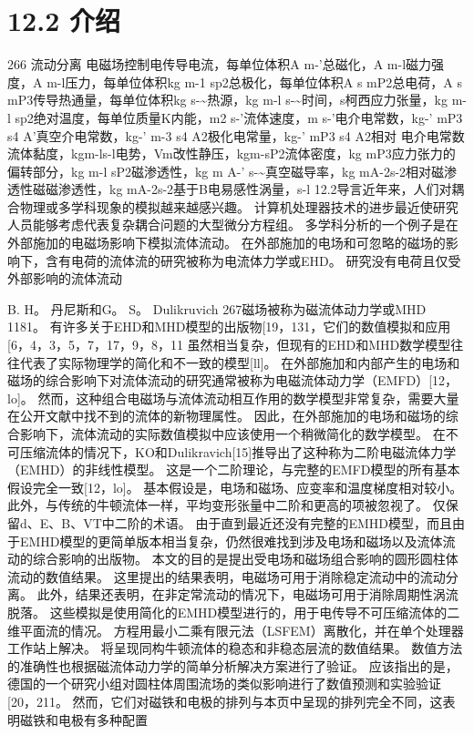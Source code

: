 \documentclass[UTF8,11pt,a4paper,openany,fontset=fandol]{ctexbook}
\begin{document}
\section{12.2 介绍}
266 流动分离 电磁场控制电传导电流，每单位体积A m-'总磁化，A m-l磁力强度，A m-l压力，每单位体积kg m-1 sp2总极化，每单位体积A s mP2总电荷，A s mP3传导热通量，每单位体积kg s-\textasciitilde{}热源，kg m-l s-\textasciitilde{}时间，s柯西应力张量，kg m-l sp2绝对温度，每单位质量K内能，m2 s-'流体速度，m s-'电介电常数，kg-' mP3 s4 A'真空介电常数，kg-' m-3 s4 A2极化电常量，kg-' mP3 s4 A2相对 电介电常数流体黏度，kgm-ls-l电势，Vm改性静压，kgm-sP2流体密度，kg mP3应力张力的偏转部分，kg m-l sP2磁渗透性，kg m A-' s-\textasciitilde{}真空磁导率，kg mA-2s-2相对磁渗透性磁磁渗透性，kg mA-2s-2基于B电易感性涡量，s-l 12.2导言近年来，人们对耦合物理或多学科现象的模拟越来越感兴趣。 计算机处理器技术的进步最近使研究人员能够考虑代表复杂耦合问题的大型微分方程组。 多学科分析的一个例子是在外部施加的电磁场影响下模拟流体流动。 在外部施加的电场和可忽略的磁场的影响下，含有电荷的流体流的研究被称为电流体力学或EHD。 研究没有电荷且仅受外部影响的流体流动

B. H。 丹尼斯和G。 S。 Dulikruvich 267磁场被称为磁流体动力学或MHD 1181。 有许多关于EHD和MHD模型的出版物[19，131，它们的数值模拟和应用[6，4，3，5，7，17，9，8，11 虽然相当复杂，但现有的EHD和MHD数学模型往往代表了实际物理学的简化和不一致的模型[ll]。 在外部施加和内部产生的电场和磁场的综合影响下对流体流动的研究通常被称为电磁流体动力学（EMFD）[12，lo]。 然而，这种组合电磁场与流体流动相互作用的数学模型非常复杂，需要大量在公开文献中找不到的流体的新物理属性。 因此，在外部施加的电场和磁场的综合影响下，流体流动的实际数值模拟中应该使用一个稍微简化的数学模型。 在不可压缩流体的情况下，KO和Dulikravich[15]推导出了这种称为二阶电磁流体力学（EMHD）的非线性模型。 这是一个二阶理论，与完整的EMFD模型的所有基本假设完全一致[12，lo]。 基本假设是，电场和磁场、应变率和温度梯度相对较小。 此外，与传统的牛顿流体一样，平均变形张量中二阶和更高的项被忽视了。 仅保留d、E、B、VT中二阶的术语。 由于直到最近还没有完整的EMHD模型，而且由于EMHD模型的更简单版本相当复杂，仍然很难找到涉及电场和磁场以及流体流动的综合影响的出版物。 本文的目的是提出受电场和磁场组合影响的圆形圆柱体流动的数值结果。 这里提出的结果表明，电磁场可用于消除稳定流动中的流动分离。 此外，结果还表明，在非定常流动的情况下，电磁场可用于消除周期性涡流脱落。 这些模拟是使用简化的EMHD模型进行的，用于电传导不可压缩流体的二维平面流的情况。 方程用最小二乘有限元法（LSFEM）离散化，并在单个处理器工作站上解决。 将呈现同构牛顿流体的稳态和非稳态层流的数值结果。 数值方法的准确性也根据磁流体动力学的简单分析解决方案进行了验证。 应该指出的是，德国的一个研究小组对圆柱体周围流场的类似影响进行了数值预测和实验验证[20，211。 然而，它们对磁铁和电极的排列与本页中呈现的排列完全不同，这表明磁铁和电极有多种配置
\end{document}
